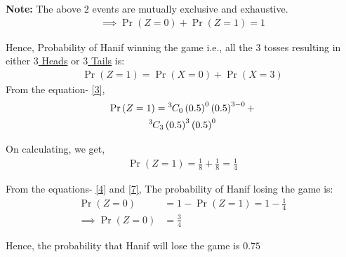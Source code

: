 \documentclass[journal,12pt,twocolumn]{IEEEtran}
\DeclareMathOperator*{\equals}{=}
\providecommand{\pr}[1]{\ensuremath{\Pr\left(#1\right)}}
\providecommand{\brak}[1]{\ensuremath{\left(#1\right)}}
\newcommand*{\permcomb}[4][0mu]{{{}^{#3}\mkern#1#2_{#4}}}
\newcommand*{\comb}[1][-1mu]{\permcomb[#1]{C}}
\newcommand{\note}{\noindent \textbf{Note: }}
\begin{document}
    \note The above $2$ events are mutually exclusive and exhaustive. 
    \begin{align}
        \implies \pr{Z = 0} + \pr{Z = 1} \equals 1 \label{4}
    \end{align}
    
    Hence, Probability of Hanif winning the game i.e., all the $3$ tosses resulting in either \underline{$3$ Heads} or \underline{$3$ Tails} is:
    \begin{align}
        \pr{Z = 1} = \pr{X = 0} + \pr{X = 3}
    \end{align}
    From the equation- \ref{3},
    \begin{multline}
    \pr{Z = 1} = \comb{3}{0}\brak{0.5}^0\brak{0.5}^{3-0} +\\ \comb{3}{3}\brak{0.5}^3\brak{0.5}^{0}
    \end{multline}
    
    On calculating, we get,
    \begin{align}
     \label{7}    \pr{Z = 1} = \frac{1}{8} + \frac{1}{8} = \frac{1}{4}
    \end{align}
    
    \noindent From the equations- \ref{4} and \ref{7}, The probability of Hanif losing the game is:
    \begin{align}
        \pr{Z = 0} &= 1 - \pr{Z = 1} = 1- \frac{1}{4}\\
        \implies \pr{Z = 0} &= \frac{3}{4}
    \end{align}
    
    Hence, the probability that Hanif will lose the game is \underline{$0.75$} 
\end{document}

